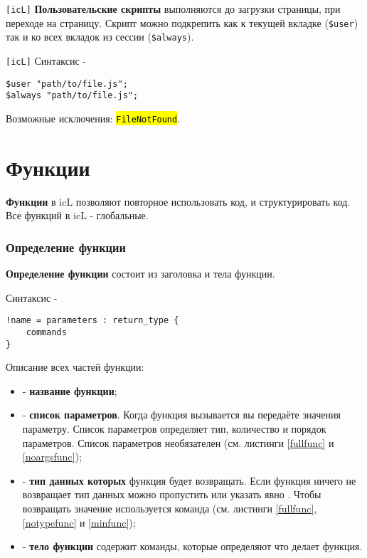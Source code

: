 \documentclass[a4paper, 14pt]{extarticle}
\newcommand{\ferror}[1]{{\fontsize{11pt}{12pt}\tt{\sethlcolor{yellow}\hl{#1}}}}
\newenvironment{icItems}
	{ \begin{itemize} [noitemsep,nolistsep] }
	{ \end{itemize} }
\begin{document}
\lstinline|[icL]| {\bf Пользовательские скрипты} выполняются до загрузки страницы, при переходе на страницу. Скрипт можно подкрепить как к текущей вкладке (\lstinline|$user|) так и ко всех вкладок из сессии (\lstinline|$always|).

\lstinline|[icL]| Синтаксис -
\begin{lstlisting}[numbers=none]
$user "path/to/file.js";
$always "path/to/file.js";
\end{lstlisting}

Возможные исключения: \ferror{FileNotFound}.

\section{Функции}

{\bf Функции} в icL позволяют повторное использовать код, и структурировать код. Все функций в icL - глобальные.

\subsubsection{Определение функции}

{\bf Определение функции} состоит из заголовка и тела функции.

\noindent Синтаксис -
\begin{lstlisting}[numbers=none]
!name = parameters : return_type {
	commands
}
\end{lstlisting}

Описание всех частей функции:
\begin{icItems}
\item
	 - {\bf название функции};
\item
	 - {\bf список параметров}. Когда функция вызывается вы передаёте значения параметру. Список параметров определяет тип, количество и порядок параметров. Список параметров необязателен (см. листинги \ref{fullfunc} и \ref{noargsfunc});
\item
	 - {\bf тип данных которых} функция будет возвращать. Если функция ничего не возвращает тип данных можно пропустить или указать явно \void{}. Чтобы возвращать значение используется команда  (см. листинги \ref{fullfunc}, \ref{notypefunc} и \ref{minfunc});
\item
	 - {\bf тело функции} содержит команды, которые определяют что делает функция.
\end{icItems}
\end{document}
